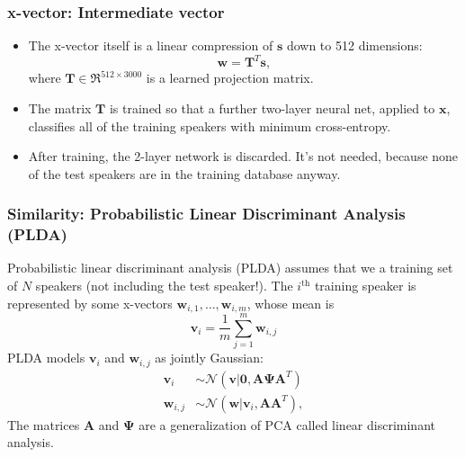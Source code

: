\documentclass{beamer}
\begin{document}
\begin{frame}
  \frametitle{x-vector: Intermediate vector}

  \begin{itemize}
    \item 
      The x-vector itself is a linear compression of $\bm{s}$ down to 512 dimensions:
      \begin{displaymath}
        \bm{w}=\bm{T}^T\bm{s},
      \end{displaymath}
      where $\bm{T}\in\Re^{512\times 3000}$ is a learned projection matrix.
    \item 
      The matrix $\bm{T}$ is
      trained so that a further two-layer neural net, applied to $\bm{x}$,
      classifies all of the training speakers with minimum cross-entropy.
    \item
      After training, the 2-layer network is discarded.  It's not
      needed, because none of the test speakers are in the training
      database anyway.
  \end{itemize}
\end{frame}

\begin{frame}
  \frametitle{Similarity: Probabilistic Linear Discriminant Analysis (PLDA)}

  Probabilistic linear discriminant analysis (PLDA) assumes that we a
  training set of $N$ speakers (not including the test speaker!).  The
  $i^{\text{th}}$ training speaker is represented by some x-vectors
  $\bm{w}_{i,1},\ldots,\bm{w}_{i,m}$, whose mean is
  \begin{displaymath}
    \bm{v}_i = \frac{1}{m}\sum_{j=1}^m\bm{w}_{i,j}
  \end{displaymath}
  PLDA models $\bm{v}_i$ and $\bm{w}_{i,j}$ as jointly Gaussian:
  \begin{align*}
    \bm{v}_i &\sim \mathcal{N}(\bm{v}|\bm{0},\bm{A}\bm{\Psi}\bm{A}^T)\\
    \bm{w}_{i,j} &\sim \mathcal{N}(\bm{w}|\bm{v}_i,\bm{A}\bm{A}^T),
  \end{align*}
  The matrices $\bm{A}$ and $\bm{\Psi}$ are a generalization of PCA
  called linear discriminant analysis.
\end{frame}
\end{document}
